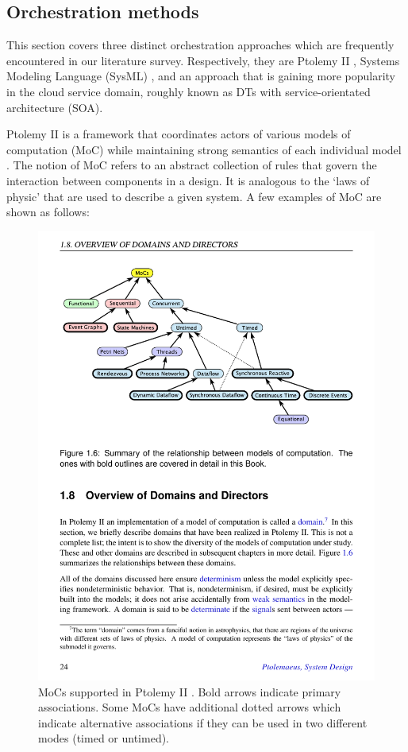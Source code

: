 \documentclass[journal,onecolumn]{IEEEtran} %
\begin{document}
\subsection{Orchestration methods}\label{sec:orctool}
This section covers three distinct orchestration approaches which are frequently encountered in our literature survey. Respectively, they are Ptolemy II \cite{ptolemy}, Systems Modeling Language (SysML) \cite{sysml}, and an approach that is gaining more popularity in the cloud service domain, roughly known as DTs with service-orientated architecture (SOA).

Ptolemy II is a framework that coordinates actors of various models of computation (MoC) while maintaining strong semantics of each individual model \cite{Ptolemaeus2014}. The notion of MoC refers to an abstract collection of rules that govern the interaction between components in a design. It is analogous to the `laws of physic' that are used to describe a given system. A few examples of MoC are shown as follows:

\begin{figure}[hbt!]
  \centering
  \includegraphics[scale=1]{figures/moc.pdf}
  \caption{MoCs supported in Ptolemy II \cite{Ptolemaeus2014}. Bold arrows indicate primary associations. Some MoCs have additional dotted arrows which indicate alternative associations if they can be used in two different modes (timed or untimed).}
  \label{fig:moc}
\end{figure}
\end{document}
